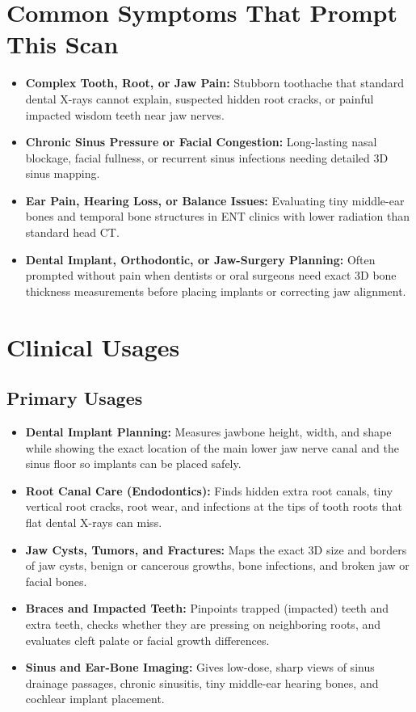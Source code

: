 \section{Common Symptoms That Prompt This Scan}
\begin{itemize}
    \item \textbf{Complex Tooth, Root, or Jaw Pain:} Stubborn toothache that standard dental X-rays cannot explain, suspected hidden root cracks, or painful impacted wisdom teeth near jaw nerves.
    \item \textbf{Chronic Sinus Pressure or Facial Congestion:} Long-lasting nasal blockage, facial fullness, or recurrent sinus infections needing detailed 3D sinus mapping.
    \item \textbf{Ear Pain, Hearing Loss, or Balance Issues:} Evaluating tiny middle-ear bones and temporal bone structures in ENT clinics with lower radiation than standard head CT.
    \item \textbf{Dental Implant, Orthodontic, or Jaw-Surgery Planning:} Often prompted without pain when dentists or oral surgeons need exact 3D bone thickness measurements before placing implants or correcting jaw alignment.
\end{itemize}

\section{Clinical Usages}

\subsection{Primary Usages}
\begin{itemize}
    \item \textbf{Dental Implant Planning:} Measures jawbone height, width, and shape while showing the exact location of the main lower jaw nerve canal and the sinus floor so implants can be placed safely.
    \item \textbf{Root Canal Care (Endodontics):} Finds hidden extra root canals, tiny vertical root cracks, root wear, and infections at the tips of tooth roots that flat dental X-rays can miss.
    \item \textbf{Jaw Cysts, Tumors, and Fractures:} Maps the exact 3D size and borders of jaw cysts, benign or cancerous growths, bone infections, and broken jaw or facial bones.
    \item \textbf{Braces and Impacted Teeth:} Pinpoints trapped (impacted) teeth and extra teeth, checks whether they are pressing on neighboring roots, and evaluates cleft palate or facial growth differences.
    \item \textbf{Sinus and Ear-Bone Imaging:} Gives low-dose, sharp views of sinus drainage passages, chronic sinusitis, tiny middle-ear hearing bones, and cochlear implant placement.
\end{itemize}

